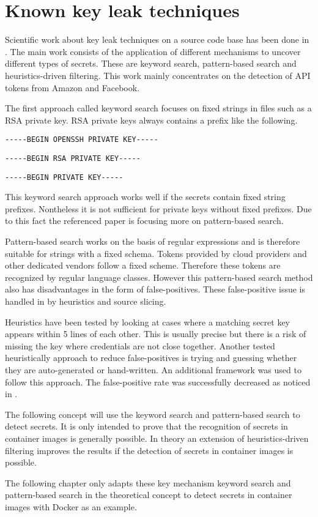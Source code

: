 %
%

\chapter{Known key leak techniques}
\label{ch:known_key_leak_techniques}
Scientific work about key leak techniques on a source code base has been done in \cite{7180102}. 
The main work consists of the application of different mechanisms to uncover different types of secrets.
These are keyword search, pattern-based search and heuristics-driven filtering.
This work mainly concentrates on the detection of API tokens from Amazon and Facebook.
	
The first approach called keyword search focuses on fixed strings in files such as a RSA private key. 
RSA private keys always contains a prefix like the following.
\begin{lstlisting}
-----BEGIN OPENSSH PRIVATE KEY-----
\end{lstlisting}
\begin{lstlisting}
-----BEGIN RSA PRIVATE KEY-----
\end{lstlisting}
\begin{lstlisting}
-----BEGIN PRIVATE KEY-----
\end{lstlisting}
This keyword search approach works well if the secrets contain fixed string prefixes. 
Nontheless it is not sufficient for private keys without fixed prefixes.
Due to this fact the referenced paper \cite{7180102} is focusing more on pattern-based search. 

Pattern-based search works on the basis of regular expressions and is therefore suitable for strings with a fixed schema.
Tokens provided by cloud providers and other dedicated vendors follow a fixed scheme. Therefore these tokens are recognized by regular language classes.
However this pattern-based search method also has disadvantages in the form of false-positives.
These false-positive issue is handled in \cite{7180102} by heuristics and source slicing.

Heuristics have been tested by looking at cases where a matching secret key appears within 5 lines of each other. 
This is usually precise but there is a risk of missing the key where credentials are not close together.
Another tested heuristically approach to reduce false-positives is trying and guessing whether they are auto-generated or hand-written. 
An additional framework was used to follow this approach. 
The false-positive rate was successfully decreased as noticed in \cite{7180102}.

The following concept will use the keyword search and pattern-based search to detect secrets. 
It is only intended to prove that the recognition of secrets in container images is generally possible. 
In theory an extension of heuristics-driven filtering improves the results if the detection of secrets in container images is possible.

The following chapter only adapts these key mechanism keyword search and pattern-based search in the theoretical concept to detect secrets in container images with Docker as an example.